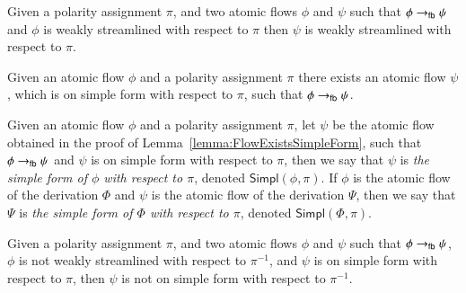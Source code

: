 \begin{lemma}\label{lemma:FourBoxesStreamlining}
Given a polarity assignment $\pi$, and two atomic flows $\phi$ and $\psi$ such that $\phi\to_{\mathsf{fb}}\psi$ and $\phi$ is weakly streamlined with respect to $\pi$ then $\psi$ is weakly streamlined with respect to $\pi$.
\end{lemma}


\begin{lemma}\label{lemma:FlowExistsSimpleForm}
Given an atomic flow $\phi$ and a polarity assignment $\pi$ there exists an atomic flow $\psi$, which is on simple form with respect to $\pi$, such that $\phi\to_{\mathsf{fb}}\psi$.
\end{lemma}


\newcommand{\Simpl}{\mathsf{Simpl}}
\begin{definition}\label{definition:TheSimpleForm}
Given an atomic flow $\phi$ and a polarity assignment $\pi$, let $\psi$ be the atomic flow obtained in the proof of Lemma~\vref{lemma:FlowExistsSimpleForm}, such that $\phi\to_{\mathsf{fb}}\psi$ and $\psi$ is on simple form with respect to $\pi$, then we say that $\psi$ is \emph{the simple form of $\phi$ with respect to $\pi$}, denoted $\Simpl(\phi,\pi)$. If $\phi$ is the atomic flow of the derivation $\Phi$ and $\psi$ is the atomic flow of the derivation $\Psi$, then we say that $\Psi$ is \emph{the simple form of $\Phi$ with respect to $\pi$}, denoted $\Simpl(\Phi,\pi)$.
\end{definition}


\begin{remark}\label{remark:FourBoxesDestroySimpleForm}
Given a polarity assignment $\pi$, and two atomic flows $\phi$ and $\psi$ such that $\phi\to_{\mathsf{fb}}\psi$, $\phi$ is not weakly streamlined with respect to $\pi^{-1}$, and $\psi$ is on simple form with respect to $\pi$, then $\psi$ is not on simple form with respect to $\pi^{-1}$.
\end{remark}
